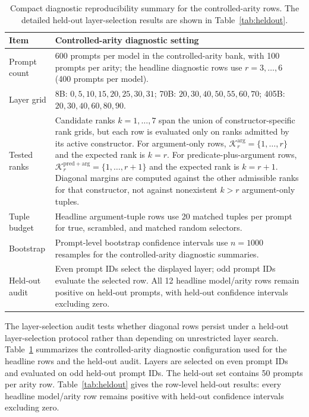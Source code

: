 \documentclass[11pt]{article}
\begin{document}
\begin{table}[H]
\centering
\scriptsize
\renewcommand{\arraystretch}{0.92}
\begin{tabular}{p{}p{}}
\toprule
Item & Controlled-arity diagnostic setting \\
\midrule
Prompt count & \parbox[t]{0.76\textwidth}{\raggedright 600 prompts per model in the controlled-arity bank, with 100 prompts per arity; the headline diagnostic rows use $r=3,\ldots,6$ (400 prompts per model).} \\
Layer grid & \parbox[t]{0.76\textwidth}{\raggedright 8B: $0,5,10,15,20,25,30,31$; 70B: $20,30,40,50,55,60,70$; 405B: $20,30,40,60,80,90$.} \\
Tested ranks & \parbox[t]{0.76\textwidth}{\raggedright Candidate ranks $k=1,\ldots,7$ span the union of constructor-specific rank grids, but each row is evaluated only on ranks admitted by its active constructor. For argument-only rows, $\mathcal{K}^{\mathrm{arg}}_r=\{1,\ldots,r\}$ and the expected rank is $k=r$. For predicate-plus-argument rows, $\mathcal{K}^{\mathrm{pred+arg}}_r=\{1,\ldots,r+1\}$ and the expected rank is $k=r+1$. Diagonal margins are computed against the other admissible ranks for that constructor, not against nonexistent $k>r$ argument-only tuples.} \\
Tuple budget & \parbox[t]{0.76\textwidth}{\raggedright Headline argument-tuple rows use 20 matched tuples per prompt for true, scrambled, and matched random selectors.} \\
Bootstrap & \parbox[t]{0.76\textwidth}{\raggedright Prompt-level bootstrap confidence intervals use $n=1000$ resamples for the controlled-arity diagnostic summaries.} \\
Held-out audit & \parbox[t]{0.76\textwidth}{\raggedright Even prompt IDs select the displayed layer; odd prompt IDs evaluate the selected row. All 12 headline model/arity rows remain positive on held-out prompts, with held-out confidence intervals excluding zero.} \\
\bottomrule
\end{tabular}
\caption{Compact diagnostic reproducibility summary for the controlled-arity rows. The detailed held-out layer-selection results are shown in Table~\ref{tab:heldout}.}
\label{tab:diagnostic-config}
\end{table}

The layer-selection audit tests whether diagonal rows persist under a held-out layer-selection protocol rather than depending on unrestricted layer search. Table~\ref{tab:diagnostic-config} summarizes the controlled-arity diagnostic configuration used for the headline rows and the held-out audit. Layers are selected on even prompt IDs and evaluated on odd held-out prompt IDs. The held-out set contains 50 prompts per arity row. Table~\ref{tab:heldout} gives the row-level held-out results: every headline model/arity row remains positive with held-out confidence intervals excluding zero.
\end{document}
